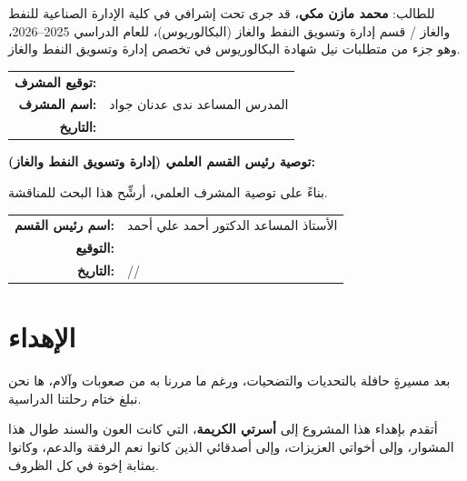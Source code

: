 \documentclass[12pt, a4paper]{report}
\begin{document}
\vspace{0.5cm}
\noindent للطالب: \textbf{محمد مازن مكي}، قد جرى تحت إشرافي في كلية الإدارة الصناعية للنفط والغاز / قسم إدارة وتسويق النفط والغاز (البكالوريوس)، للعام الدراسي 2025--2026، وهو جزء من متطلبات نيل شهادة البكالوريوس في تخصص إدارة وتسويق النفط والغاز.

\vspace{0.8cm}

\begin{tabular}{r l}
\textbf{توقيع المشرف:} & \underline{\hspace{6cm}} \\[0.8cm]
\textbf{اسم المشرف:} & المدرس المساعد ندى عدنان جواد \\[0.8cm]
\textbf{التاريخ:} & \underline{\hspace{6cm}} \\
\end{tabular}

\vspace{1cm}

\noindent\textbf{توصية رئيس القسم العلمي (إدارة وتسويق النفط والغاز):}

\vspace{0.3cm}
\noindent بناءً على توصية المشرف العلمي، أرشِّح هذا البحث للمناقشة.

\vspace{1cm}

\begin{tabular}{r l}
\textbf{اسم رئيس القسم:} & الأستاذ المساعد الدكتور أحمد علي أحمد \\[0.5cm]
\textbf{التوقيع:} & \underline{\hspace{6cm}} \\[0.5cm]
\textbf{التاريخ:} & \quad /\quad /\quad \\
\end{tabular}

\newpage\thispagestyle{empty}
\chapter*{الإهداء}

بعد مسيرةٍ حافلة بالتحديات والتضحيات، ورغم ما مررنا به من صعوبات وآلام، ها نحن نبلغ ختام رحلتنا الدراسية.

أتقدم بإهداء هذا المشروع إلى \textbf{أسرتي الكريمة}، التي كانت العون والسند طوال هذا المشوار، وإلى أخواتي العزيزات، وإلى أصدقائي الذين كانوا نعم الرفقة والدعم، وكانوا بمثابة إخوة في كل الظروف.
\end{document}
